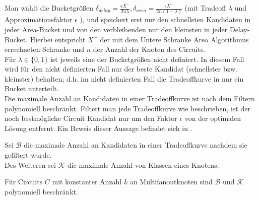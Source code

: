 \documentclass[11pt, a4paper, german]{article}
\begin{document}
Man wählt die Bucketgrößen $\delta_{delay} = \frac{\epsilon X^{-}}{2n\lambda}, \delta_{area} = \frac{\epsilon X^{-}}{2n(1-\lambda)}$ (mit Tradeoff $\lambda$ und Approximationsfaktor $\epsilon$ ), und speichert erst nur den schnellsten Kandidaten in jeder Area-Bucket und von den verbleibenden nur den kleinsten in jeder Delay-Bucket. Hierbei entspricht $X^-$ der mit dem Untere Schranke Area Algorithmus errechneten Schranke und $n$ der Anzahl der Knoten des Circuits. \\
Für $\lambda \in \{ 0,1 \}$ ist jeweils eine der Bucketgrößen nicht definiert. In diesem Fall wird für den nicht definierten Fall nur der beste Kandidat (schnellster bzw. kleinster) behalten; d.h. im nicht definierten Fall die Tradeoffkurve in nur ein Bucket unterteilt.\\
Die maximale Anzahl an Kandidaten in einer Tradeoffkurve ist nach dem Filtern polynomiell beschränkt. 
Filtert man jede Tradeoffkurve wie beschrieben, ist der noch bestmögliche Circuit Kandidat nur um den Faktor $\epsilon$ von der optimalen Lösung entfernt. Ein Beweis dieser Aussage befindet sich in \cite{Elbert}.
\begin{definition}
Sei $\mathcal{B}$ die maximale Anzahl an Kandidaten in einer Tradeoffkurve nachdem sie gefiltert wurde.\\
Des Weiteren sei $\mathcal{K}$ die maximale Anzahl von Klassen eines Knotens.
\end{definition}
\begin{cor}\label{cor:anzahl_klassen}
Für Circuits $C$ mit konstanter Anzahl $k$ an Multifanoutknoten sind $\mathcal{B}$ und $\mathcal{K}$ polynomiell beschränkt.
\end{cor}
\end{document}
